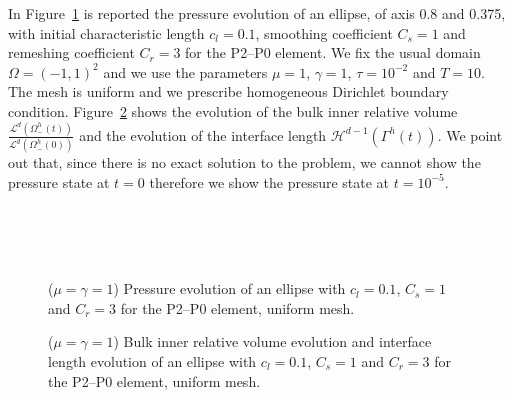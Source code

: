 \documentclass[a4paper,12pt,onecolumn]{article}
\begin{document}
In Figure~\ref{fig:ellipse_both} is reported the pressure evolution of an ellipse, of axis 0.8 and 0.375, with initial characteristic length $c_l=0.1$, smoothing coefficient $C_s=1$ and remeshing coefficient $C_r=3$ for the P2--P0 element. We fix the usual domain $\Omega = (-1,1)^2$ and we use the parameters $\mu=1$, $\gamma=1$, $\tau=10^{-2}$ and $T=10$. The mesh is uniform and we prescribe homogeneous Dirichlet
boundary condition. Figure~\ref{fig:ellipse_both_volumes} shows the evolution of the bulk inner relative volume $\frac{\mathcal{L}^d(\Omega^h_-(t))}{\mathcal{L}^d(\Omega^h_-(0))}$ and the evolution of the interface length $\mathcal{H}^{d-1}(\Gamma^h(t))$. We point out that, since there is no exact solution to the problem, we cannot show the pressure state at $t=0$ therefore we show the pressure state at $t=10^{-5}$.
\begin{figure}[htbp]
  \centering
  \\
  \quad
  \\
  \quad
  \\
  \caption{($\mu=\gamma=1$) Pressure evolution of an ellipse with $c_l=0.1$, $C_s=1$ and $C_r=3$ for the P2--P0 element, uniform mesh.}
  \label{fig:ellipse_both}
\end{figure}

\begin{figure}[htbp]
  \centering
  \caption{($\mu=\gamma=1$) Bulk inner relative volume evolution and interface length evolution of an ellipse with $c_l=0.1$, $C_s=1$ and $C_r=3$ for the P2--P0 element, uniform mesh.}
  \label{fig:ellipse_both_volumes}
\end{figure}
\end{document}

